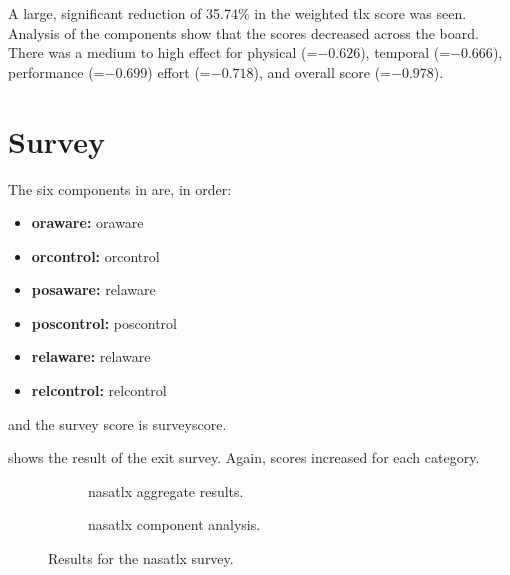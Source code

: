   A large, significant reduction of 35.74\% in the weighted \gls{tlx} score was seen.
  Analysis of the components show that the scores decreased across the board.
  There was a medium to high effect for physical (=$-0.626$), temporal (=$-0.666$), performance (=$-0.699$) effort (=$-0.718$), and overall score (=$-0.978$).

  \section{Survey}
  The six components in  are, in order:

  \begin{itemize}
    \item \textbf{\acrshort{oraware}:} \acrlong{oraware}
    \item \textbf{\acrshort{orcontrol}:} \acrlong{orcontrol}
    \item \textbf{\acrshort{posaware}:} \acrlong{relaware}
    \item \textbf{\acrshort{poscontrol}:} \acrlong{poscontrol}
    \item \textbf{\acrshort{relaware}:} \acrlong{relaware}
    \item \textbf{\acrshort{relcontrol}:} \acrlong{relcontrol}
  \end{itemize}

  \noindent and the survey score is \acrshort{surveyscore}.
  

   shows the result of the exit survey.
  Again, scores increased for each category.

  \begin{figure}[h]
    \centering
    \begin{subfigure}[b]{0.45\textwidth}
      
      \caption{\gls{nasatlx} aggregate results.}
      \label{fig:survey_results}
    \end{subfigure}
    \hfill
    \begin{subfigure}[b]{0.45\textwidth}
      
      \caption{\gls{nasatlx} component analysis.}
      \label{fig:survey_components}
    \end{subfigure}
    \caption[NASA-TLX results]{Results for the \gls{nasatlx} survey.}
    \label{fig:survey}
  \end{figure}

